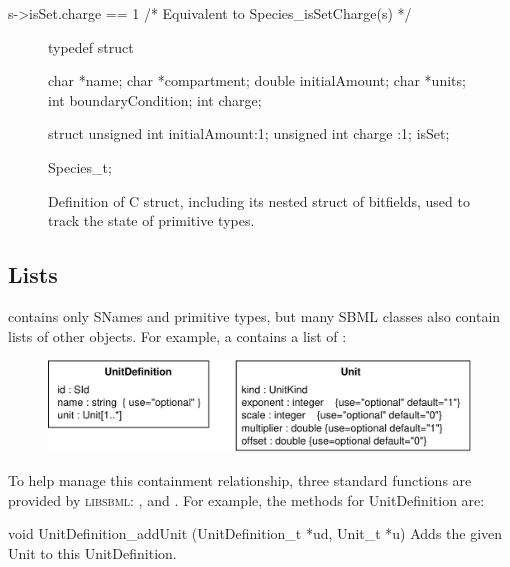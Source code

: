 \documentclass{cekmanual}
\newcommand{\libsbml}{\textsc{libsbml}}
\begin{document}
\begin{example}[c]
  s->isSet.charge == 1  /* Equivalent to Species_isSetCharge(s) */
\end{example}


\begin{figure}[bth]
  \begin{codeVerbatim}[C,flexiblecolumns=false]
typedef struct
{
  char    *name;
  char    *compartment;
  double  initialAmount;
  char    *units;
  int     boundaryCondition;
  int     charge;

  struct
  {
    unsigned int initialAmount:1;
    unsigned int charge       :1;
  } isSet;

} Species_t;
  \end{codeVerbatim}
  \caption{Definition of  C struct, including its
  nested  struct of bitfields, used to track the state
  of primitive types.}
  \label{fig:species-isSet}
\end{figure}


\subsection{Lists}
\label{sec:lists}

 contains only SNames and primitive types, but many
SBML classes also contain lists of other objects.  For example, a
 contains a list of :


\begin{figure}[h]
  \centering
  \includegraphics[scale=0.68]{unitdefinition}
  \label{fig:unit-definition}
\end{figure}


To help manage this containment relationship, three standard functions are
provided by \libsbml{}: ,  and
.  For example, the methods for UnitDefinition
are:


\begin{methoddef}{void UnitDefinition\_addUnit (UnitDefinition\_t *ud,
Unit\_t *u)}
  Adds the given Unit to this UnitDefinition.
\end{methoddef}
\end{document}
